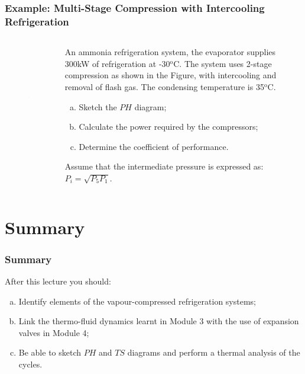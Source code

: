 \documentclass[10pt,compress]{beamer}
\begin{document}
\begin{frame}
 \frametitle{Example: Multi-Stage Compression with Intercooling Refrigeration}
 \begin{columns}
  \begin{column}[c]{0.45\linewidth}
   \begin{figure}%
      \includegraphics[width=5.5cm,height=4.5cm,clip]{./Pics/Overview_Refrig30}
   \end{figure}  
  \end{column}  
  \begin{column}[c]{0.55\linewidth}
   An ammonia refrigeration system, the evaporator supplies 300kW of refrigeration at -30$^{\text{o}}$C.  The system uses 2-stage compression as shown in the Figure, with intercooling and removal of flash gas.  The condensing temperature is 35$^{\text{o}}$C.
    \begin{enumerate}[(a)]
     \item Sketch the $PH$ diagram;
     \item Calculate the power required by the compressors;
     \item Determine the coefficient of performance.
    \end{enumerate}

Assume that the intermediate pressure is expressed as: $P_{i}=\sqrt{P_{5}P_{1}}$.
  \end{column}  
 \end{columns} 
\end{frame}





\section{Summary}

\begin{frame}
 \frametitle{Summary}
  After this lecture you should:
 \begin{enumerate}[(a)]
  \item <1-> Identify elements of the vapour-compressed refrigeration systems;
  \item <2-> Link the thermo-fluid dynamics learnt in Module 3 with the use of expansion valves in Module 4;
  \item <3-> Be able to sketch $PH$ and $TS$ diagrams and perform a thermal analysis of the cycles.
 \end{enumerate}
\end{frame}
\end{document}
